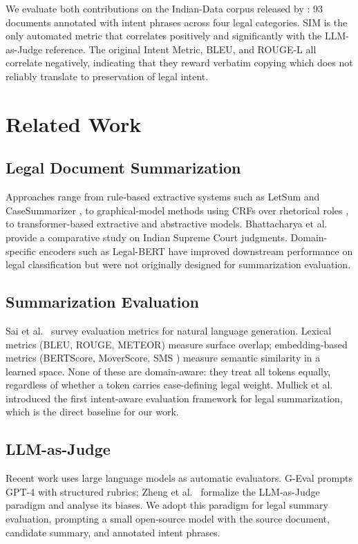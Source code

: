 \documentclass[conference,a4paper]{IEEEtran}
\begin{document}
We evaluate both contributions on the Indian-Data corpus released by \cite{mullick2022}: 93 documents annotated with intent phrases across four legal categories. SIM is the only automated metric that correlates positively and significantly with the LLM-as-Judge reference. The original Intent Metric, BLEU, and ROUGE-L all correlate negatively, indicating that they reward verbatim copying which does not reliably translate to preservation of legal intent.

\section{Related Work}

\subsection{Legal Document Summarization}
Approaches range from rule-based extractive systems such as LetSum \cite{farzindar2004letsum} and CaseSummarizer \cite{polsley2016casesummarizer}, to graphical-model methods using CRFs over rhetorical roles \cite{saravanan2006improving}, to transformer-based extractive \cite{miller2019leveraging} and abstractive \cite{beltagy2020longformer} models. Bhattacharya et al.~\cite{bhattacharya2019comparative} provide a comparative study on Indian Supreme Court judgments. Domain-specific encoders such as Legal-BERT \cite{chalkidis2020legal} have improved downstream performance on legal classification but were not originally designed for summarization evaluation.

\subsection{Summarization Evaluation}
Sai et al.~\cite{sai2020survey} survey evaluation metrics for natural language generation. Lexical metrics (BLEU, ROUGE, METEOR) measure surface overlap; embedding-based metrics (BERTScore, MoverScore, SMS \cite{clark2019sentence}) measure semantic similarity in a learned space. None of these are domain-aware: they treat all tokens equally, regardless of whether a token carries case-defining legal weight. Mullick et al.~\cite{mullick2022} introduced the first intent-aware evaluation framework for legal summarization, which is the direct baseline for our work.

\subsection{LLM-as-Judge}
Recent work uses large language models as automatic evaluators. G-Eval \cite{liu2023geval} prompts GPT-4 with structured rubrics; Zheng et al.~\cite{zheng2023judging} formalize the LLM-as-Judge paradigm and analyse its biases. We adopt this paradigm for legal summary evaluation, prompting a small open-source model with the source document, candidate summary, and annotated intent phrases.
\end{document}
